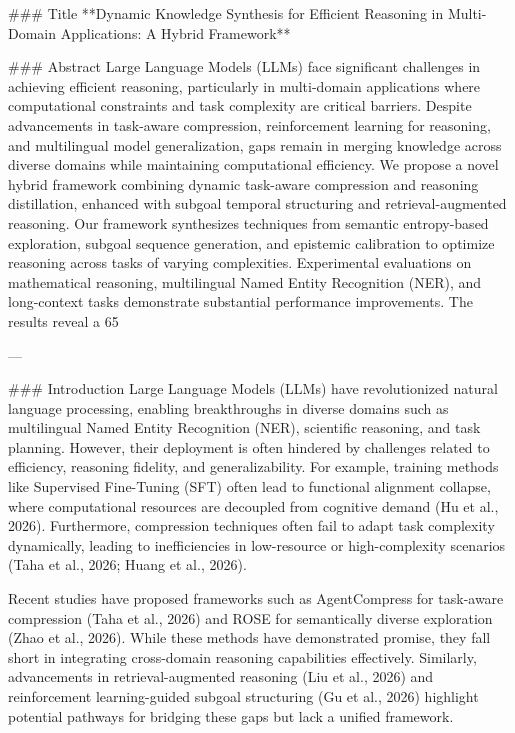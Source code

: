 ### Title
**Dynamic Knowledge Synthesis for Efficient Reasoning in Multi-Domain Applications: A Hybrid Framework**

### Abstract
Large Language Models (LLMs) face significant challenges in achieving efficient reasoning, particularly in multi-domain applications where computational constraints and task complexity are critical barriers. Despite advancements in task-aware compression, reinforcement learning for reasoning, and multilingual model generalization, gaps remain in merging knowledge across diverse domains while maintaining computational efficiency. We propose a novel hybrid framework combining dynamic task-aware compression and reasoning distillation, enhanced with subgoal temporal structuring and retrieval-augmented reasoning. Our framework synthesizes techniques from semantic entropy-based exploration, subgoal sequence generation, and epistemic calibration to optimize reasoning across tasks of varying complexities. Experimental evaluations on mathematical reasoning, multilingual Named Entity Recognition (NER), and long-context tasks demonstrate substantial performance improvements. The results reveal a 65%

---

### Introduction
Large Language Models (LLMs) have revolutionized natural language processing, enabling breakthroughs in diverse domains such as multilingual Named Entity Recognition (NER), scientific reasoning, and task planning. However, their deployment is often hindered by challenges related to efficiency, reasoning fidelity, and generalizability. For example, training methods like Supervised Fine-Tuning (SFT) often lead to functional alignment collapse, where computational resources are decoupled from cognitive demand (Hu et al., 2026). Furthermore, compression techniques often fail to adapt task complexity dynamically, leading to inefficiencies in low-resource or high-complexity scenarios (Taha et al., 2026; Huang et al., 2026).

Recent studies have proposed frameworks such as AgentCompress for task-aware compression (Taha et al., 2026) and ROSE for semantically diverse exploration (Zhao et al., 2026). While these methods have demonstrated promise, they fall short in integrating cross-domain reasoning capabilities effectively. Similarly, advancements in retrieval-augmented reasoning (Liu et al., 2026) and reinforcement learning-guided subgoal structuring (Gu et al., 2026) highlight potential pathways for bridging these gaps but lack a unified framework.

